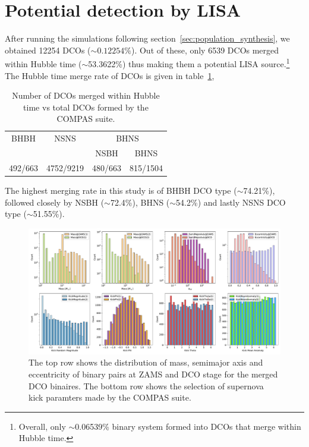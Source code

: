 \documentclass[journal, twocolumn]{IEEEtran}
\begin{document}
	\section{Potential detection by LISA}
	\label{sec:potential-detection-by-lisa}
    
    After running the simulations following section~\ref{sec:population_synthesis}, we obtained 12254 DCOs ($\sim0.12254\%$).
    Out of these, only 6539 DCOs merged within Hubble time ($\sim$53.3622\%) thus making them a potential LISA source.\footnote{Overall, only $\sim$0.06539\% binary system formed into DCOs that merge within Hubble time.}
    The Hubble time merge rate of DCOs is given in table~\ref{tab:dco_details},

    \begin{table}[!h]
        \centering
        \begin{tabular}{@{}cccc@{}}
        	\toprule
            \multirow{2.5}{*}{BHBH} & \multirow{2.5}{*}{NSNS} & \multicolumn{2}{c}{BHNS} \\ \cmidrule(l){3-4}
            &           & NSBH    & BHNS     \\ \midrule
            492/663 & 4752/9219 & 480/663 & 815/1504 \\ \bottomrule
        \end{tabular}%
        \caption{Number of DCOs merged within Hubble time vs total DCOs formed by the COMPAS suite.}
        \label{tab:dco_details}
    \end{table}

    The highest merging rate in this study is of BHBH DCO type ($\sim$74.21\%), followed closely by NSBH ($\sim$72.4\%), BHNS ($\sim$54.2\%) and lastly NSNS DCO type ($\sim$51.55\%).

	\begin{figure}[!h]
		\centering
	     \includegraphics[width=\textwidth]{analysis_data/varE_main_file_analysis/all_zams_params}
		\caption{The top row shows the distribution of mass, semimajor axis and eccentricity of binary pairs at ZAMS and DCO stage for the merged DCO binaires. The bottom row shows the selection of supernova kick paramters made by the COMPAS suite.}
		\label{fig:all_zams_params}
	\end{figure}
\end{document}

